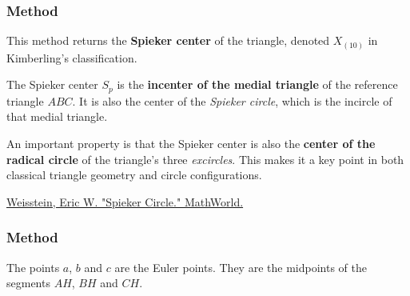 \subsubsection{Method }
\label{ssub:method_triangle_spieker_center}

This method returns the \textbf{Spieker center} of the triangle, denoted $X_{(10)}$ in Kimberling’s classification.

\medskip

The Spieker center $S_p$ is the \textbf{incenter of the medial triangle} of the reference triangle $ABC$. It is also the center of the \emph{Spieker circle}, which is the incircle of that medial triangle.

\medskip

An important property is that the Spieker center is also the \textbf{center of the radical circle} of the triangle’s three \emph{excircles}. This makes it a key point in both classical triangle geometry and circle configurations.
\begin{flushright}
\small
\href{https://mathworld.wolfram.com/SpiekerCircle.html}{Weisstein, Eric W. "Spieker Circle." MathWorld.}
\end{flushright}

\vspace{1em}

\begin{tkzexample}[latex=.5\textwidth]
\end{tkzexample}

\subsubsection{Method } %
\label{ssub:method_triangle_euler__points}

The points $a$, $b$ and $c$ are the Euler points. They are the midpoints of the segments $AH$, $BH$ and $CH$.

